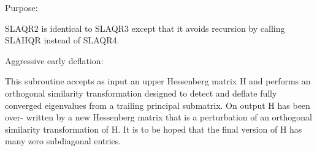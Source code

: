  \begin{DoxyParagraph}{Purpose\+: }
\begin{DoxyVerb}    SLAQR2 is identical to SLAQR3 except that it avoids
    recursion by calling SLAHQR instead of SLAQR4.

    Aggressive early deflation:

    This subroutine accepts as input an upper Hessenberg matrix
    H and performs an orthogonal similarity transformation
    designed to detect and deflate fully converged eigenvalues from
    a trailing principal submatrix.  On output H has been over-
    written by a new Hessenberg matrix that is a perturbation of
    an orthogonal similarity transformation of H.  It is to be
    hoped that the final version of H has many zero subdiagonal
    entries.\end{DoxyVerb}
 
\end{DoxyParagraph}

